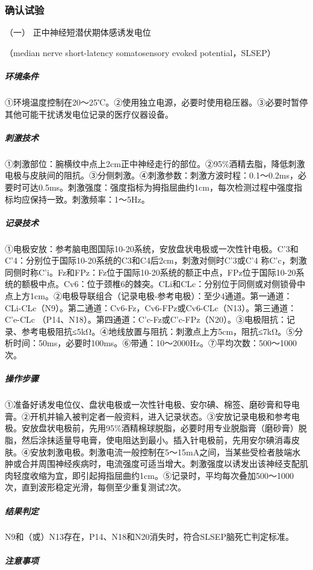 \subsubsection{确认试验}

\hypertarget{text00069.htmlux5cux23CHP3-1-5-3-1}{}
（一） 正中神经短潜伏期体感诱发电位

（median nerve short-latency somatosensory evoked potential，SLSEP）

\subparagraph{环境条件}

①环境温度控制在20～25℃。②使用独立电源，必要时使用稳压器。③必要时暂停其他可能干扰诱发电位记录的医疗仪器设备。

\subparagraph{刺激技术}

①刺激部位：腕横纹中点上2cm正中神经走行的部位。②95\%酒精去脂，降低刺激电极与皮肤间的阻抗。③分侧刺激。④刺激参数：刺激方波时程：0.1～0.2ms，必要时可达0.5ms。刺激强度：强度指标为拇指屈曲约1cm，每次检测过程中强度指标均应保持一致。刺激频率：1～5Hz。

\subparagraph{记录技术}

①电极安放：参考脑电图国际10-20系统，安放盘状电极或一次性针电极。C'3和C'4：分别位于国际10-20系统的C3和C4后2cm，刺激对侧时C'3或C'4
称C'c，刺激同侧时称C'i。Fz和FPz：Fz位于国际10-20系统的额正中点，FPz位于国际10-20系统的额极中点。Cv6：位于颈椎6的棘突。CLi和CLc：分别位于同侧或对侧锁骨中点上方1cm。②电极导联组合（记录电极-参考电极）：至少4通道。第一通道：CLi-CLc（N9）。第二通道：Cv6-Fz，Cv6-FPz或Cv6-CLc（N13）。第三通道：C'e-CLc
（P14、N18）。第四通道：C'c-Fz或C'c-FPz（N20）。③电极阻抗：记录、参考电极阻抗≤5kΩ。④地线放置与阻抗：刺激点上方5cm，阻抗≤7kΩ。⑤分析时间：50ms，必要时100ms。⑥带通：10～2000Hz。⑦平均次数：500～1000次。

\subparagraph{操作步骤}

①准备好诱发电位仪、盘状电极或一次性针电极、安尔碘、棉签、磨砂膏和导电膏。②开机并输入被判定者一般资料，进入记录状态。③安放记录电极和参考电极。安放盘状电极前，先用95\%酒精棉球脱脂，必要时用专业脱脂膏（磨砂膏）脱脂，然后涂抹适量导电膏，使电阻达到最小。插入针电极前，先用安尔碘消毒皮肤。④安放刺激电极。刺激电流一般控制在5～15mA之间，当某些受检者肢端水肿或合并周围神经疾病时，电流强度可适当增大。刺激强度以诱发出该神经支配肌肉轻度收缩为宜，即引起拇指屈曲约1cm。⑤记录时，平均每次叠加500～1000次，直到波形稳定光滑，每侧至少重复测试2次。

\subparagraph{结果判定}

N9和（或）N13存在，P14、N18和N20消失时，符合SLSEP脑死亡判定标准。

\subparagraph{注意事项}

